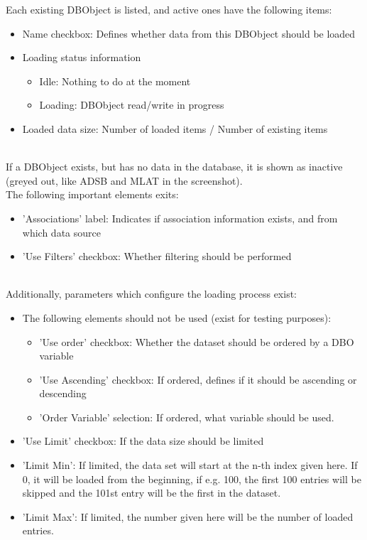 Each existing DBObject is listed, and active ones have the following items:

\begin{itemize}
 \item Name checkbox: Defines whether data from this DBObject should be loaded
 \item Loading status information
  \begin{itemize}
  \item Idle: Nothing to do at the moment
  \item Loading: DBObject read/write in progress
  \end{itemize}
 \item Loaded data size: Number of loaded items / Number of existing items
\end{itemize}
\ \\

If a DBObject exists, but has no data in the database, it is shown as inactive (greyed out, like ADSB and MLAT in the screenshot).\\

The following important elements exits:
\begin{itemize}
 \item 'Associations' label: Indicates if association information exists, and from which data source
 \item 'Use Filters' checkbox: Whether filtering should be performed
\end{itemize}
\ \\

Additionally, parameters which configure the loading process exist:

\begin{itemize}
\item The following elements should not be used (exist for testing purposes):
\begin{itemize}
 \item 'Use order' checkbox: Whether the dataset should be ordered by a DBO variable
 \item 'Use Ascending' checkbox: If ordered, defines if it should be ascending or descending
 \item 'Order Variable' selection: If ordered, what variable should be used.
\end{itemize}
 \item 'Use Limit' checkbox: If the data size should be limited
 \item 'Limit Min': If limited, the data set will start at the n-th index given here. If 0, it will be loaded from the beginning, if e.g. 100, the first 100 entries will be skipped and the 101st entry will be the first in the dataset.
\item 'Limit Max': If limited, the number given here will be the number of loaded entries.
\end{itemize}
\ \\

